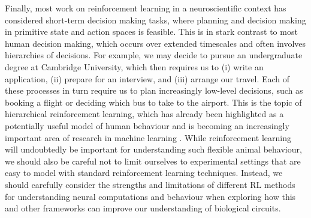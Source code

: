 Finally, most work on reinforcement learning in a neuroscientific context has considered short-term decision making tasks, where planning and decision making in primitive state and action spaces is feasible.
This is in stark contrast to most human decision making, which occurs over extended timescales and often involves hierarchies of decisions.
For example, we may decide to pursue an undergraduate degree at Cambridge University, which then requires us to (i) write an application, (ii) prepare for an interview, and (iii) arrange our travel.
Each of these processes in turn require us to plan increasingly low-level decisions, such as booking a flight or deciding which bus to take to the airport.
This is the topic of hierarchical reinforcement learning, which has already been highlighted as a potentially useful model of human behaviour \citep{eckstein2020computational,botvinick2008hierarchical,botvinick2009hierarchically} and is becoming an increasingly important area of research in machine learning \citep{pateria2021hierarchical}.
While reinforcement learning will undoubtedly be important for understanding such flexible animal behaviour, we should also be careful not to limit ourselves to experimental settings that are easy to model with standard reinforcement learning techniques.
Instead, we should carefully consider the strengths and limitations of different RL methods for understanding neural computations and behaviour when exploring how this and other frameworks can improve our understanding of biological circuits.

